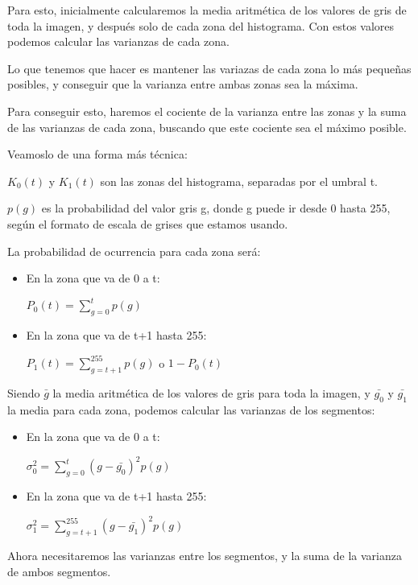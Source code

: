Para esto, inicialmente calcularemos la media aritmética de los valores de gris de toda la imagen, y después solo de cada zona del histograma. Con estos valores podemos calcular las varianzas de cada zona. 

Lo que tenemos que hacer es mantener las variazas de cada zona lo más pequeñas posibles, y conseguir que la varianza entre ambas zonas sea la máxima.

Para conseguir esto, haremos el cociente de la varianza entre las zonas y la suma de las varianzas de cada zona, buscando que este cociente sea el máximo posible. 

Veamoslo de una forma más técnica:

$K_0(t)$ y $K_1(t)$ son las zonas del histograma, separadas por el umbral t.

$p(g)$ es la probabilidad del valor gris g, donde g puede ir desde 0 hasta 255, según el formato de escala de grises que estamos usando.

La probabilidad de ocurrencia para cada zona será:
\begin{itemize}

\item En la zona que va de 0 a t:

$P_0(t)= \sum_{g=0}^{t}p(g)$ 

\item En la zona que va de t+1 hasta 255:

$P_1(t)= \sum_{g=t+1}^{255}p(g)$ o $1-P_0(t)$

\end{itemize}

Siendo $\bar{g}$ la media aritmética de los valores de gris para toda la imagen, y $\bar{g_0}$ y $\bar{g_1}$ la media para cada zona, podemos calcular las varianzas de los segmentos:

\begin{itemize}

\item En la zona que va de 0 a t:

$\sigma{_0^2} = \sum_{g=0}^{t}(g-\bar{g_0})^2p(g)$

\item En la zona que va de t+1 hasta 255:

$\sigma{_1^2} = \sum_{g=t+1}^{255}(g-\bar{g_1})^2p(g)$

\end{itemize}

Ahora necesitaremos las varianzas entre los segmentos, y la suma de la varianza de ambos segmentos.

